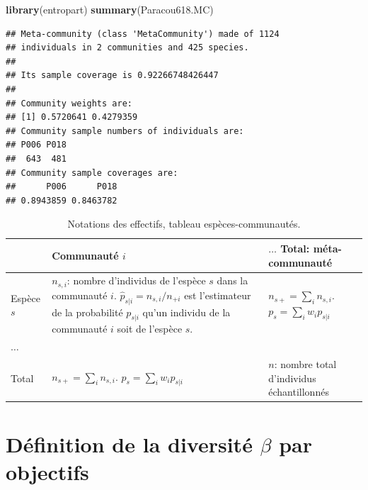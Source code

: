 \documentclass[
  11pt,
  french,
  a4paper,
  extrafontsizes,onecolumn,openright
  ]{memoir}
\newenvironment{Shaded}{\begin{snugshade}}{\end{snugshade}}
\newcommand{\KeywordTok}[1]{\textcolor[rgb]{0.13,0.29,0.53}{\textbf{#1}}}
\newcommand{\NormalTok}[1]{#1}
\begin{document}
\scriptsize

\begin{Shaded}
\begin{Highlighting}[]
\KeywordTok{library}\NormalTok{(entropart)}
\KeywordTok{summary}\NormalTok{(Paracou618.MC)}
\end{Highlighting}
\end{Shaded}

\begin{verbatim}
## Meta-community (class 'MetaCommunity') made of 1124 
## individuals in 2 communities and 425 species. 
## 
## Its sample coverage is 0.92266748426447 
## 
## Community weights are: 
## [1] 0.5720641 0.4279359
## Community sample numbers of individuals are: 
## P006 P018 
##  643  481 
## Community sample coverages are: 
##      P006      P018 
## 0.8943859 0.8463782
\end{verbatim}

\normalsize



\scriptsize

\begin{table}

\caption{\label{tab:Notations}Notations des effectifs, tableau espèces-communautés.}
\centering
\fontsize{9}{11}\selectfont
\begin{tabu} to 
\toprule
 & Communauté $i$ & $\dots$ Total: méta-communauté\\
\midrule
Espèce $s$ & $n_{s,i}$: nombre d'individus de l'espèce $s$ dans la communauté $i$. $\hat{p}_{s|i}=n_{s,i}/n_{+i}$ est l'estimateur de la probabilité $p_{s|i}$ qu'un individu de la communauté $i$ soit de l'espèce $s$. & $n_{s+}=\sum_i{n_{s,i}}$. $p_s=\sum_i{w_{i}p_{s|i}}$\\
$\dots$ &  & \\
Total & $n_{s+}=\sum_i{n_{s,i}}$. $p_s=\sum_i{w_{i}p_{s|i}}$ & $n$: nombre total d'individus échantillonnés\\
\bottomrule
\end{tabu}
\end{table}

\normalsize

\hypertarget{duxe9finition-de-la-diversituxe9-beta-par-objectifs}{%
\section{\texorpdfstring{Définition de la diversité \(\beta\) par objectifs}{Définition de la diversité \textbackslash beta par objectifs}}\label{duxe9finition-de-la-diversituxe9-beta-par-objectifs}}
\end{document}
